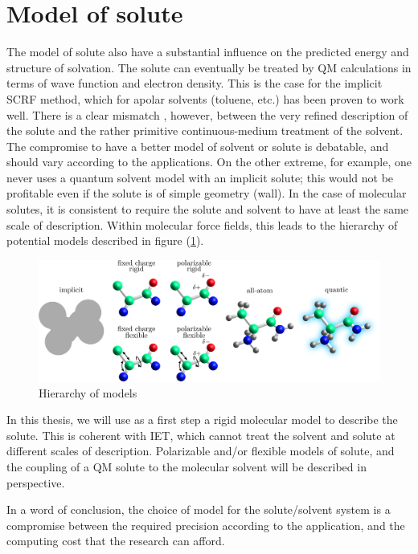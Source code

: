 \section{Model of solute}

The model of solute also have a substantial influence on the predicted
energy and structure of solvation. The solute can eventually be treated
by \acs{QM} calculations in terms of wave function and electron density.
This is the case for the implicit SCRF method, which for apolar solvents
(toluene, etc.) has been proven to work well. There is a clear mismatch
, however, between the very refined description of the solute and
the rather primitive continuous-medium treatment of the solvent. The
compromise to have a better model of solvent or solute is debatable,
and should vary according to the applications. On the other extreme,
for example, one never uses a quantum solvent model with an implicit
solute; this would not be profitable even if the solute is of simple
geometry (wall). In the case of molecular solutes, it is consistent
to require the solute and solvent to have at least the same scale
of description. Within molecular force fields, this leads to the hierarchy
of potential models described in figure (\ref{fig:Hierarchy-of-models}).
\begin{figure}[h]
\centering{}%
\noindent\begin{minipage}[t]{1\columnwidth}%
\begin{center}
\includegraphics[width=1\columnwidth]{_figure/solute}
\par\end{center}%
\end{minipage}\caption{Hierarchy of models\label{fig:Hierarchy-of-models}}
\end{figure}

In this thesis, we will use as a first step a rigid molecular model
to describe the solute. This is coherent with IET, which cannot treat
the solvent and solute at different scales of description. Polarizable
and/or flexible models of solute, and the coupling of a QM solute
to the molecular solvent will be described in perspective.

In a word of conclusion, the choice of model for the solute/solvent
system is a compromise between the required precision according to
the application, and the computing cost that the research can afford.
